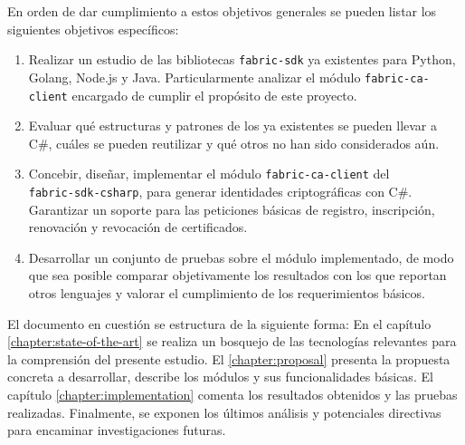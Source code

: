 
En orden de dar cumplimiento a estos objetivos generales se pueden listar los siguientes objetivos específicos:

 

\begin{enumerate}
	\item Realizar un estudio de las bibliotecas \texttt{fabric-sdk} ya existentes para Python, Golang, Node.js y Java. Particularmente analizar el m\'odulo \texttt{fabric-ca-client} encargado de cumplir el prop\'osito de este proyecto. 
	
	\item Evaluar qu\'e estructuras y patrones de los ya existentes se pueden llevar a C\#, cu\'ales se pueden reutilizar y qu\'e otros no han sido considerados a\'un.
	
	\item Concebir, dise\~nar, implementar el m\'odulo \texttt{fabric-ca-client} del
	\\
	\texttt{fabric-sdk-csharp}, para generar identidades criptogr\'aficas con C\#. Garantizar un soporte para las peticiones b\'asicas de registro, inscripci\'on, renovaci\'on y revocaci\'on de certificados.
	
	
	\item Desarrollar un conjunto de pruebas sobre el m\'odulo implementado, de modo que sea posible comparar objetivamente los resultados con los que reportan otros lenguajes y valorar el cumplimiento de los requerimientos b\'asicos.
\end{enumerate}

El documento en cuesti\'on se estructura de la siguiente forma: En el cap\'itulo \ref{chapter:state-of-the-art} se realiza un bosquejo de las tecnolog\'ias relevantes para la comprensi\'on del presente estudio. El \ref{chapter:proposal} presenta la propuesta concreta a desarrollar, describe los m\'odulos y sus funcionalidades b\'asicas. El cap\'itulo \ref{chapter:implementation} comenta los resultados obtenidos y las pruebas realizadas. Finalmente, se exponen los \'ultimos an\'alisis y potenciales directivas para encaminar investigaciones futuras.

